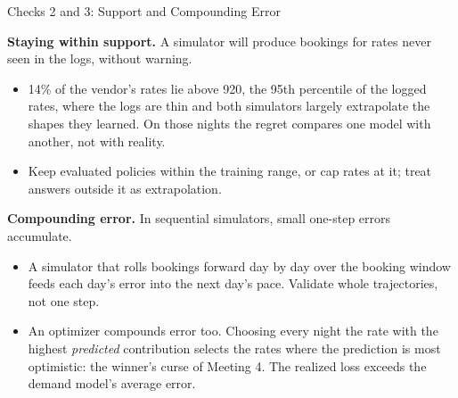 \documentclass[aspectratio=169, 11pt, handout]{beamer}
\begin{document}
\begin{frame}{Checks 2 and 3: Support and Compounding Error}

\textbf{Staying within support.} A simulator will produce bookings for rates never seen in the logs, without warning.
\begin{itemize}
  \item 14\% of the vendor's rates lie above 920, the 95th percentile of the logged rates, where the logs are thin and both simulators largely extrapolate the shapes they learned. On those nights the regret compares one model with another, not with reality.
  \item Keep evaluated policies within the training range, or cap rates at it; treat answers outside it as extrapolation.
\end{itemize}

\medskip

\textbf{Compounding error.} In sequential simulators, small one-step errors accumulate.
\begin{itemize}
  \item A simulator that rolls bookings forward day by day over the booking window feeds each day's error into the next day's pace. Validate whole trajectories, not one step.
  \item An optimizer compounds error too. Choosing every night the rate with the highest \emph{predicted} contribution selects the rates where the prediction is most optimistic: the winner's curse of Meeting 4. The realized loss exceeds the demand model's average error.
\end{itemize}
\end{frame}
\end{document}
